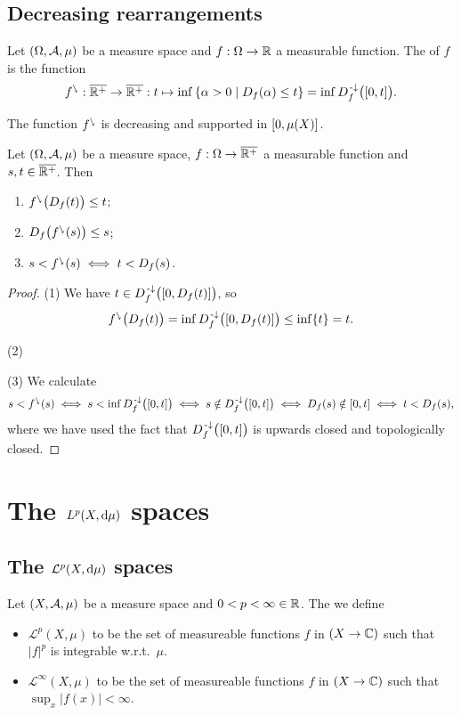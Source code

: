 \subsection{Decreasing rearrangements}
\begin{definition}
Let $\sSet{\Omega, \mathcal{A}, \mu}$ be a measure space and $f: \Omega\to \mathbb{R}$ a measurable function. The  of $f$ is the function
\[ \decRearrange{f}: \overline{\R^+}\to \overline{\R^+}: t \mapsto \inf\setbuilder{\alpha > 0}{D_f(\alpha)\leq t} = \inf D_f^{\preimf}\big(\interval{0,t}\big).  \]
\end{definition}

The function ${f}^{\ssearrow}$ is decreasing and supported in $\interval[c]{0,\mu(X)}$.



\begin{proposition}
Let $\sSet{\Omega, \mathcal{A}, \mu}$ be a measure space, $f: \Omega\to \overline{\mathbb{R}^+}$ a measurable function and $s,t\in \overline{\mathbb{R}^+}$. Then
\begin{enumerate}
\item ${f}^{\ssearrow}\big(D_f(t)\big) \leq t$;
\item $D_f\big({f}^{\ssearrow}(s)\big) \leq s$;
\item $s < {f}^{\ssearrow}(s) \iff t < D_f(s)$.
\end{enumerate}
\end{proposition}
\begin{proof}
(1) We have $t\in D_f^\preimf\big(\interval{0,D_f(t)}\big)$, so
\[ \decRearrange{f}\big(D_f(t)\big) = \inf D_f^\preimf\big(\interval{0,D_f(t)}\big)\leq \inf\{t\} = t. \]

(2)

(3) We calculate
\[ s < \decRearrange{f}(s) \iff s< \inf D_f^{\preimf}\big(\interval{0,t}\big) \iff s\notin D_f^{\preimf}\big(\interval{0,t}\big) \iff D_f(s) \notin \interval{0,t} \iff t < D_f(s), \]
where we have used the fact that $D_f^{\preimf}\big(\interval{0,t}\big)$ is upwards closed and topologically closed.
\end{proof}


\section{The $L^p(X,\operatorname{d \!}{\mu})$ spaces}
\subsection{The $\mathcal{L}^p(X,\operatorname{d \!}{\mu})$ spaces}
\begin{definition}
Let $\sSet{X,\mathcal{A},\mu}$ be a measure space and $0<p<\infty \in \mathbb{R}$. The we define
\begin{itemize}
\item $\mathcal{L}^p(X,\mu)$ to be the set of measureable functions $f$ in $(X\to \mathbb{C})$ such that $|f|^p$ is integrable w.r.t.\ $\mu$.
\item $\mathcal{L}^\infty(X,\mu)$ to be the set of measureable functions $f$ in $(X\to \mathbb{C})$ such that $\sup_x|f(x)|<\infty$.
\end{itemize}
\end{definition}


